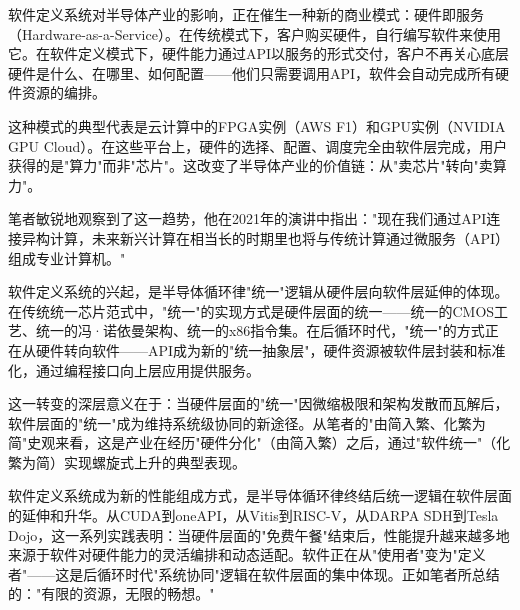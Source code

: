 \documentclass[11pt,a4paper]{article}
\begin{document}
软件定义系统对半导体产业的影响，正在催生一种新的商业模式：硬件即服务（Hardware-as-a-Service）。在传统模式下，客户购买硬件，自行编写软件来使用它。在软件定义模式下，硬件能力通过API以服务的形式交付，客户不再关心底层硬件是什么、在哪里、如何配置——他们只需要调用API，软件会自动完成所有硬件资源的编排。

这种模式的典型代表是云计算中的FPGA实例（AWS F1）和GPU实例（NVIDIA GPU Cloud）。在这些平台上，硬件的选择、配置、调度完全由软件层完成，用户获得的是"算力"而非"芯片"。这改变了半导体产业的价值链：从"卖芯片"转向"卖算力"。

笔者敏锐地观察到了这一趋势，他在2021年的演讲中指出："现在我们通过API连接异构计算，未来新兴计算在相当长的时期里也将与传统计算通过微服务（API）组成专业计算机。"

软件定义系统的兴起，是半导体循环律"统一"逻辑从硬件层向软件层延伸的体现。在传统统一芯片范式中，"统一"的实现方式是硬件层面的统一——统一的CMOS工艺、统一的冯·诺依曼架构、统一的x86指令集。在后循环时代，"统一"的方式正在从硬件转向软件——API成为新的"统一抽象层"，硬件资源被软件层封装和标准化，通过编程接口向上层应用提供服务。

这一转变的深层意义在于：当硬件层面的"统一"因微缩极限和架构发散而瓦解后，软件层面的"统一"成为维持系统级协同的新途径。从笔者的"由简入繁、化繁为简"史观来看，这是产业在经历"硬件分化"（由简入繁）之后，通过"软件统一"（化繁为简）实现螺旋式上升的典型表现。

软件定义系统成为新的性能组成方式，是半导体循环律终结后统一逻辑在软件层面的延伸和升华。从CUDA到oneAPI，从Vitis到RISC-V，从DARPA SDH到Tesla Dojo，这一系列实践表明：当硬件层面的"免费午餐"结束后，性能提升越来越多地来源于软件对硬件能力的灵活编排和动态适配。软件正在从"使用者"变为"定义者"——这是后循环时代"系统协同"逻辑在软件层面的集中体现。正如笔者所总结的："有限的资源，无限的畅想。"

\end{document}
